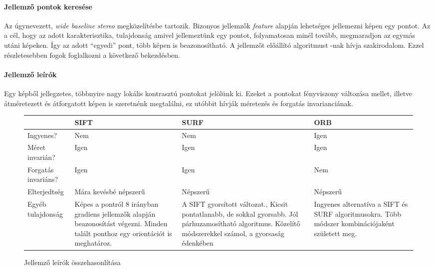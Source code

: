 \documentclass[12pt,a4paper,oneside]{report} %
\begin{document}
\paragraph{Jellemző pontok keresése}
Az úgynevezett, \textit{wide baseline stereo} megközelítésbe tartozik.
Bizonyos jellemzők \textit{feature} alapján lehetséges jellemezni képen egy pontot. Az a cél, hogy az adott karakterisztika, tulajdonság amivel jellemeztünk egy pontot, folyamatosan minél tovább, megmaradjon az egymás utáni képeken. Így az adott ``egyedi'' pont, több képen is beazonosítható. A jellemzőt előállító algoritmust -nak hívja szakirodalom. Ezzel részletesebben fogok foglalkozni a következő bekezdésben.

\paragraph{Jellemző leírók}
Egy képből jellegzetes, többnyire nagy lokális kontrasztú pontokat jelölünk ki. Ezeket a pontokat fényviszony változása mellet, illetve átméretezett és átforgatott képen is szeretnénk megtalálni, ez utóbbit hívják méretezés és forgatás invarianciának.
\begin{figure}[H]
	\centering
	\begin{tabular}{s|p{3.5cm}|p{3.5cm}|p{3.5cm} }
		& SIFT \cite{lowe2004distinctive} & SURF \cite{bay2006surf} &  ORB \cite{rublee2011orb} \\
		\hline
		Ingyenes? & Nem & Nem & Igen \\
		Méret invarián? & Igen & Igen & Igen \\
		Forgatás invariáns? & Igen & Igen & Nem \\
		Elterjedtség & Mára kevésbé népszerű & Népszerű & Népszerű \\
		Egyéb tulajdonság 
		& Képes a pontról 8 irányban gradiens jellemzők alapján beazonosítást végezni.
		Minden talált ponthoz egy orientációt is meghatároz. 
		& A SIFT gyorsított változat., Kicsit pontatlanabb, de sokkal gyorsabb. Jól párhuzamosítható algoritmus. Közelítő módszerekkel számol, a gyorsaság édenkében 
		& Ingyenes alternatíva a SIFT és SURF algoritmusokra. Több módszer kombinációjaként született meg.\\
		
	\end{tabular}
	\caption{Jellemző leírók összehasonlítása}
\end{figure}
\end{document}
